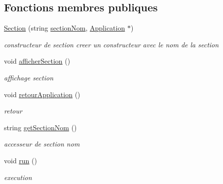 \subsection*{Fonctions membres publiques}
\begin{DoxyCompactItemize}
\item 
\hyperlink{class_section_abce12f33b3d02ae26aa071ee084379fb}{Section} (string \hyperlink{class_section_a4bb51bd5ac41f66e9935f8e1e46e1c45}{section\+Nom}, \hyperlink{class_application}{Application} $\ast$)
\begin{DoxyCompactList}\small\item\em constructeur de section creer un constructeur avec le nom de la section \end{DoxyCompactList}\item 
void \hyperlink{class_section_ad8bb64a516f00af11ec88262133936ff}{afficher\+Section} ()
\begin{DoxyCompactList}\small\item\em affichage section \end{DoxyCompactList}\item 
void \hyperlink{class_section_af9bc407774a67c0ce65d831fcf2005b2}{retour\+Application} ()
\begin{DoxyCompactList}\small\item\em retour \end{DoxyCompactList}\item 
string \hyperlink{class_section_a00b708087544f4830f3d8e115753e028}{get\+Section\+Nom} ()
\begin{DoxyCompactList}\small\item\em accesseur de section nom \end{DoxyCompactList}\item 
void \hyperlink{class_section_ad60532fac7868faad0b9b6ae413c860d}{run} ()
\begin{DoxyCompactList}\small\item\em execution \end{DoxyCompactList}\end{DoxyCompactItemize}
